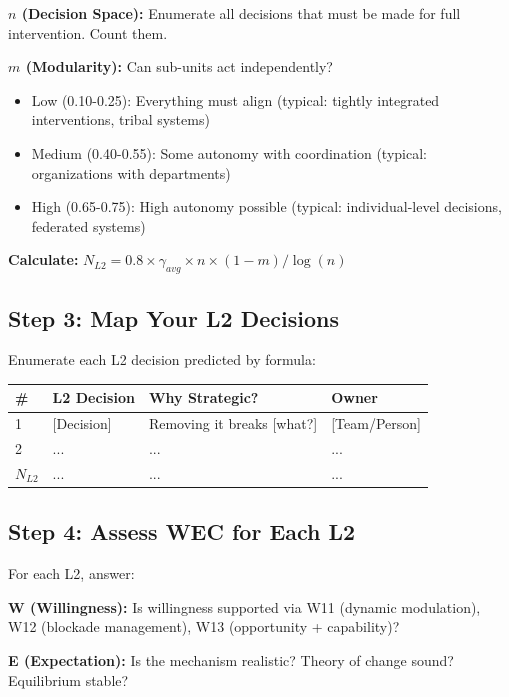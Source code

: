\documentclass[11pt, a4paper]{article}
\begin{document}
\textbf{$n$ (Decision Space):} Enumerate all decisions that must be made for full intervention. Count them.

\textbf{$m$ (Modularity):} Can sub-units act independently?
\begin{itemize}[nosep]
    \item Low (0.10-0.25): Everything must align (typical: tightly integrated interventions, tribal systems)
    \item Medium (0.40-0.55): Some autonomy with coordination (typical: organizations with departments)
    \item High (0.65-0.75): High autonomy possible (typical: individual-level decisions, federated systems)
\end{itemize}

\textbf{Calculate:} $N_{L2} = 0.8 \times \gamma_{avg} \times n \times (1-m) / \log(n)$

\subsection{Step 3: Map Your L2 Decisions} \label{sec:ch15-part5d}

Enumerate each L2 decision predicted by formula:

\begin{center}
\begin{tabular}{|l|l|l|l|}
\hline
\textbf{\#} & \textbf{L2 Decision} & \textbf{Why Strategic?} & \textbf{Owner} \\
\hline
1 & [Decision] & Removing it breaks [what?] & [Team/Person] \\
\hline
2 & ... & ... & ... \\
\hline
$N_{L2}$ & ... & ... & ... \\
\hline
\end{tabular}
\end{center}

\subsection{Step 4: Assess WEC for Each L2} \label{sec:ch15-part5e}

For each L2, answer:

\textbf{W (Willingness):} Is willingness supported via W11 (dynamic modulation), W12 (blockade management), W13 (opportunity + capability)?

\textbf{E (Expectation):} Is the mechanism realistic? Theory of change sound? Equilibrium stable?
\end{document}
